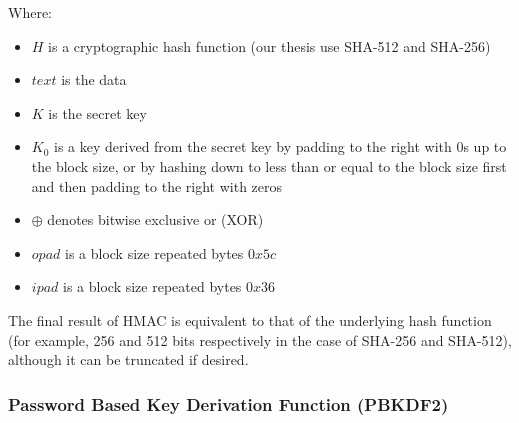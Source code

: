 Where:\\
\begin{itemize}
\item $H$ is a cryptographic hash function (our thesis use SHA-512 and SHA-256)\\
\item $text$ is the data\\
\item $K$ is the secret key\\
\item $K_0$ is a key derived from the secret key by padding to the right with 0s up to the block size, or by hashing down to less than or equal to the block size first and then padding to the right with zeros\\
\item $\oplus$ denotes bitwise exclusive or (XOR) \\
\item $opad$ is a block size repeated bytes $0x5c$ \\
\item $ipad$ is a block size repeated bytes $0x36$ \\ 
\end{itemize}
\vspace{0.2cm}
The final result of HMAC is equivalent to that of the underlying hash function (for example, 256 and 512 bits respectively in the case of SHA-256 and SHA-512), although it can be truncated if desired.\\

\subsubsection{Password Based Key Derivation Function (PBKDF2)}

